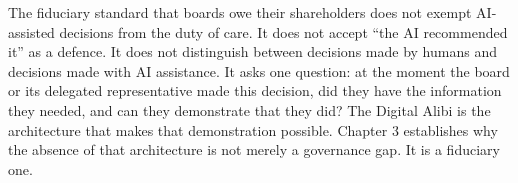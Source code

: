 The fiduciary standard that boards owe their shareholders does not exempt AI-assisted decisions from the duty of care. It does not accept ``the AI recommended it'' as a defence. It does not distinguish between decisions made by humans and decisions made with AI assistance. It asks one question: at the moment the board or its delegated representative made this decision, did they have the information they needed, and can they demonstrate that they did? The Digital Alibi is the architecture that makes that demonstration possible. Chapter 3 establishes why the absence of that architecture is not merely a governance gap. It is a fiduciary one.

